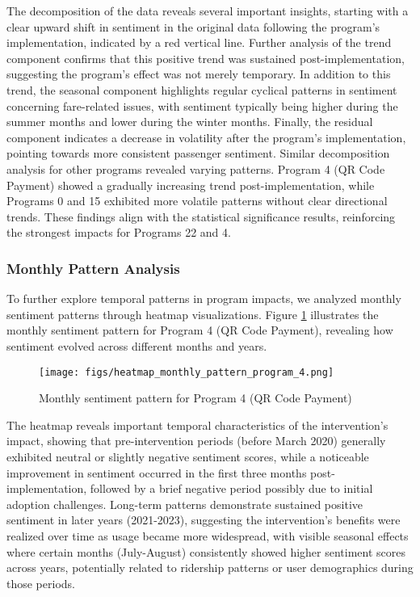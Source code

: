 \documentclass[a4paper,fleqn,12pt]{cas-sc}
\begin{document}
The decomposition of the data reveals several important insights, starting with a clear upward shift in sentiment in the original data following the program's implementation, indicated by a red vertical line. Further analysis of the trend component confirms that this positive trend was sustained post-implementation, suggesting the program's effect was not merely temporary. In addition to this trend, the seasonal component highlights regular cyclical patterns in sentiment concerning fare-related issues, with sentiment typically being higher during the summer months and lower during the winter months. Finally, the residual component indicates a decrease in volatility after the program's implementation, pointing towards more consistent passenger sentiment.
Similar decomposition analysis for other programs revealed varying patterns. Program 4 (QR Code Payment) showed a gradually increasing trend post-implementation, while Programs 0 and 15 exhibited more volatile patterns without clear directional trends. These findings align with the statistical significance results, reinforcing the strongest impacts for Programs 22 and 4.

\subsubsection{Monthly Pattern Analysis}

To further explore temporal patterns in program impacts, we analyzed monthly sentiment patterns through heatmap visualizations. Figure \ref{fig:heatmap_monthly} illustrates the monthly sentiment pattern for Program 4 (QR Code Payment), revealing how sentiment evolved across different months and years.

\begin{figure}[h]
\centering
\texttt{[image: figs/heatmap\_monthly\_pattern\_program\_4.png]}
\caption{Monthly sentiment pattern for Program 4 (QR Code Payment)}
\label{fig:heatmap_monthly}
\end{figure}

The heatmap reveals important temporal characteristics of the intervention's impact, showing that pre-intervention periods (before March 2020) generally exhibited neutral or slightly negative sentiment scores, while a noticeable improvement in sentiment occurred in the first three months post-implementation, followed by a brief negative period possibly due to initial adoption challenges. Long-term patterns demonstrate sustained positive sentiment in later years (2021-2023), suggesting the intervention's benefits were realized over time as usage became more widespread, with visible seasonal effects where certain months (July-August) consistently showed higher sentiment scores across years, potentially related to ridership patterns or user demographics during those periods.
\end{document}
